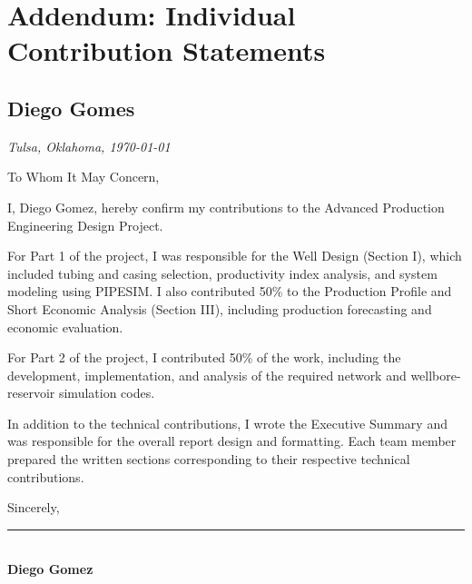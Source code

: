 
\chapter*{Addendum: Individual Contribution Statements}


\section*{Diego Gomes}

\noindent
\textit{Tulsa, Oklahoma, \today}

\vspace{0.5em}
\noindent
To Whom It May Concern,

\vspace{0.5em}
\noindent
I, Diego Gomez, hereby confirm my contributions to the Advanced Production Engineering Design Project.

For Part 1 of the project, I was responsible for the Well Design (Section I), which included tubing and casing selection, productivity index analysis, and system modeling using PIPESIM. I also contributed 50\% to the Production Profile and Short Economic Analysis (Section III), including production forecasting and economic evaluation.

For Part 2 of the project, I contributed 50\% of the work, including the development, implementation, and analysis of the required network and wellbore-reservoir simulation codes.

In addition to the technical contributions, I wrote the Executive Summary and was responsible for the overall report design and formatting. Each team member prepared the written sections corresponding to their respective technical contributions.

\vspace{1em}
\noindent
Sincerely,\\[1.5em]
\rule{6cm}{0.4pt}\\
\textbf{Diego Gomez}

